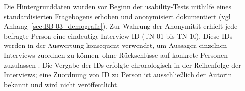 Die Hintergrunddaten wurden vor Beginn der \Gls{usability}-Tests mithilfe eines standardisierten Fragebogens erhoben und anonymisiert dokumentiert (\acrshort{vgl} Anhang~\ref{sec:BB-03_demografie}). Zur Wahrung der Anonymität erhielt jede befragte Person eine eindeutige Interview-ID (TN-01 bis TN-10). Diese IDs werden in der Auswertung konsequent verwendet, um Aussagen einzelnen Interviews zuordnen zu können, ohne Rückschlüsse auf konkrete Personen zuzulassen \cite{422:Flick2018}. Die Vergabe der IDs erfolgte chronologisch in der Reihenfolge der Interviews; eine Zuordnung von ID zu Person ist ausschließlich der Autorin bekannt und wird nicht veröffentlicht.
